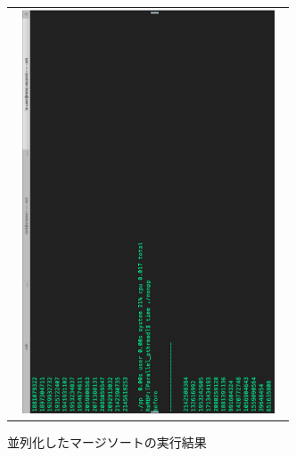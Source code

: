 \documentclass[11pt,a4paper]{jsarticle}
\begin{document}
\begin{figure}[htbp]
 \begin{tabular}{c}
  \begin{minipage}{0.5\hsize}
   \begin{center}
   \includegraphics[width=8cm,height=12cm,angle=270]{image2-crop.pdf}
   \caption{並列化したマージソートの実行結果}
   \end{center}
  \end{minipage}
 \end{tabular}
\end{figure}
\end{document}
